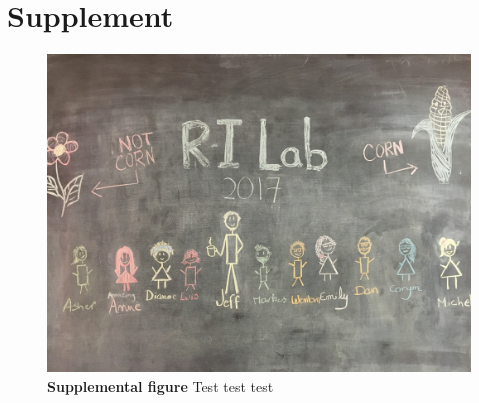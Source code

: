 \documentclass[article,9pt,twocolumn,twoside]{rilabRxiv}
\newcommand{\beginsupplement}{%
        \setcounter{table}{0}
        \renewcommand{\thetable}{S\arabic{table}}%
        \setcounter{figure}{0}
        \renewcommand{\thefigure}{S\arabic{figure}}%
     }
\begin{document}
\onecolumn
\section*{Supplement}



\beginsupplement


\blindtext
\begin{figure}[h!]
\includegraphics[width=.9\linewidth]{figures/lab_group.png}
\caption{\textbf{Supplemental figure} Test test test}
\label{fig:S1}
\end{figure}
\pagebreak
\end{document}
